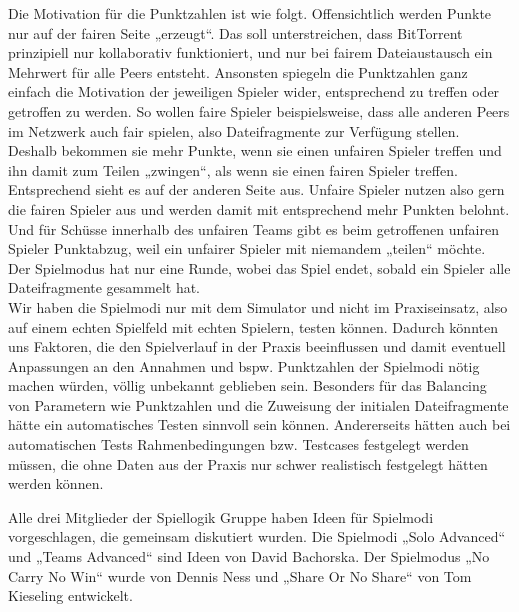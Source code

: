 Die Motivation für die Punktzahlen ist wie folgt. Offensichtlich werden Punkte nur auf der fairen Seite „erzeugt“. Das soll unterstreichen, dass BitTorrent prinzipiell nur kollaborativ funktioniert, und nur bei fairem Dateiaustausch ein Mehrwert für alle Peers entsteht. Ansonsten spiegeln die Punktzahlen ganz einfach die Motivation der jeweiligen Spieler wider, entsprechend zu treffen oder getroffen zu werden. So wollen faire Spieler beispielsweise, dass alle anderen Peers im Netzwerk auch fair spielen, also Dateifragmente zur Verfügung stellen. Deshalb bekommen sie mehr Punkte, wenn sie einen unfairen Spieler treffen und ihn damit zum Teilen „zwingen“, als wenn sie einen fairen Spieler treffen. Entsprechend sieht es auf der anderen Seite aus. Unfaire Spieler nutzen also gern die fairen Spieler aus und werden damit mit entsprechend mehr Punkten belohnt. Und für Schüsse innerhalb des unfairen Teams gibt es beim getroffenen unfairen Spieler Punktabzug, weil ein unfairer Spieler mit niemandem „teilen“ möchte. \\
Der Spielmodus hat nur eine Runde, wobei das Spiel endet, sobald ein Spieler alle Dateifragmente gesammelt hat. \\

\noindent
Wir haben die Spielmodi nur mit dem Simulator und nicht im Praxiseinsatz, also auf einem echten Spielfeld mit echten Spielern, testen können. Dadurch könnten uns Faktoren, die den Spielverlauf in der Praxis beeinflussen und damit eventuell Anpassungen an den Annahmen und bspw. Punktzahlen der Spielmodi nötig machen würden, völlig unbekannt geblieben sein. Besonders für das Balancing von Parametern wie Punktzahlen und die Zuweisung der initialen Dateifragmente hätte ein automatisches Testen sinnvoll sein können. Andererseits hätten auch bei automatischen Tests Rahmenbedingungen bzw. Testcases festgelegt werden müssen, die ohne Daten aus der Praxis nur schwer realistisch festgelegt hätten werden können.

Alle drei Mitglieder der Spiellogik Gruppe haben Ideen für Spielmodi vorgeschlagen, die gemeinsam diskutiert wurden. Die Spielmodi „Solo Advanced“ und „Teams Advanced“ sind Ideen von David Bachorska. Der Spielmodus „No Carry No Win“ wurde von Dennis Ness und „Share Or No Share“ von Tom Kieseling entwickelt.
